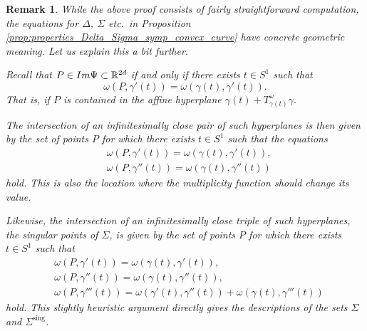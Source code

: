 \documentclass[12pt]{article}
\newtheorem{remark}[lemma]{Remark}
\newcommand{\R}{{\mathbb R}}
\begin{document}
\begin{remark}
{\rm
While the above proof consists of fairly straightforward computation, the equations for $\Delta$, $\Sigma$ etc.~in Proposition \ref{prop:properties_Delta_Sigma_symp_convex_curve} have concrete geometric meaning. Let us explain this a bit further.

Recall that $P\in {\rm Im} \Psi\subset \R^{2d}$ if and only if there exists $t\in S^1$ such that
\begin{equation} \nonumber
\omega(P,\gamma'(t))=\omega(\gamma(t),\gamma'(t)).
\end{equation} 
That is, if $P$ is contained in the affine hyperplane $\gamma(t)+T_{\gamma(t)}^\omega\gamma$.

The intersection of an infinitesimally close pair of such hyperplanes is then given by the set of points $P$ for which there exists $t\in S^1$ such that the equations
\begin{equation} \nonumber
\begin{aligned}
&\omega(P,\gamma'(t))=\omega(\gamma(t),\gamma'(t)),\\ 
&\omega(P,\gamma''(t))=\omega(\gamma(t),\gamma''(t))
\end{aligned}
\end{equation} 
hold. This is also the location where the multiplicity function should change its value.

Likewise, the intersection of an infinitesimally close triple of such hyperplanes, the singular points of $\Sigma$, is
given by the set of points $P$ for which there exists $t\in S^1$ such that
\begin{equation} \nonumber
\begin{aligned}
&\omega(P,\gamma'(t))=\omega(\gamma(t),\gamma'(t)),\\ 
&\omega(P,\gamma''(t))=\omega(\gamma(t),\gamma''(t)),\\
&\omega(P,\gamma'''(t))=\omega(\gamma'(t),\gamma''(t)) +\omega(\gamma(t),\gamma'''(t))
\end{aligned}
\end{equation} 
hold. This slightly heuristic argument directly gives the descriptions of the sets $\Sigma$ and $\Sigma^{\mathrm{sing}}$.

}
\end{remark}
\end{document}
